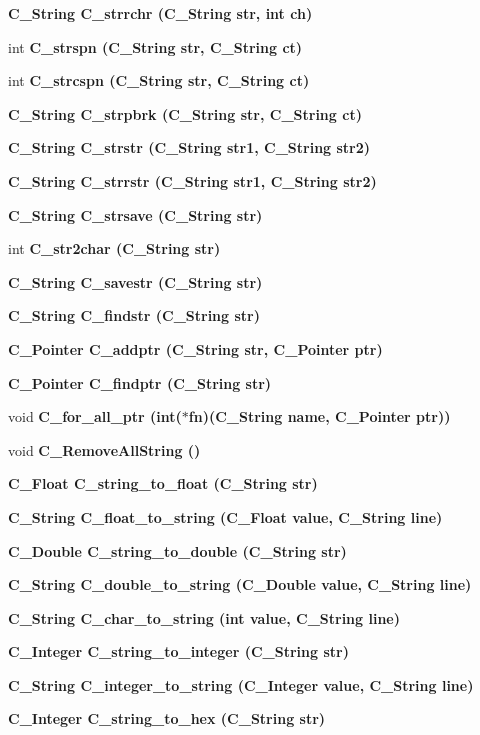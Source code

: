 \begin{CompactItemize}
\bf{C\_\-String} \bf{C\_\-strrchr} (\bf{C\_\-String} str, int ch)
\item 
int \bf{C\_\-strspn} (\bf{C\_\-String} str, \bf{C\_\-String} ct)
\item 
int \bf{C\_\-strcspn} (\bf{C\_\-String} str, \bf{C\_\-String} ct)
\item 
\bf{C\_\-String} \bf{C\_\-strpbrk} (\bf{C\_\-String} str, \bf{C\_\-String} ct)
\item 
\bf{C\_\-String} \bf{C\_\-strstr} (\bf{C\_\-String} str1, \bf{C\_\-String} str2)
\item 
\bf{C\_\-String} \bf{C\_\-strrstr} (\bf{C\_\-String} str1, \bf{C\_\-String} str2)
\item 
\bf{C\_\-String} \bf{C\_\-strsave} (\bf{C\_\-String} str)
\item 
int \bf{C\_\-str2char} (\bf{C\_\-String} str)
\item 
\bf{C\_\-String} \bf{C\_\-savestr} (\bf{C\_\-String} str)
\item 
\bf{C\_\-String} \bf{C\_\-findstr} (\bf{C\_\-String} str)
\item 
\bf{C\_\-Pointer} \bf{C\_\-addptr} (\bf{C\_\-String} str, \bf{C\_\-Pointer} ptr)
\item 
\bf{C\_\-Pointer} \bf{C\_\-findptr} (\bf{C\_\-String} str)
\item 
void \bf{C\_\-for\_\-all\_\-ptr} (int($\ast$fn)(\bf{C\_\-String} \bf{name}, \bf{C\_\-Pointer} ptr))
\item 
void \bf{C\_\-Remove\-All\-String} ()
\item 
\bf{C\_\-Float} \bf{C\_\-string\_\-to\_\-float} (\bf{C\_\-String} str)
\item 
\bf{C\_\-String} \bf{C\_\-float\_\-to\_\-string} (\bf{C\_\-Float} value, \bf{C\_\-String} line)
\item 
\bf{C\_\-Double} \bf{C\_\-string\_\-to\_\-double} (\bf{C\_\-String} str)
\item 
\bf{C\_\-String} \bf{C\_\-double\_\-to\_\-string} (\bf{C\_\-Double} value, \bf{C\_\-String} line)
\item 
\bf{C\_\-String} \bf{C\_\-char\_\-to\_\-string} (int value, \bf{C\_\-String} line)
\item 
\bf{C\_\-Integer} \bf{C\_\-string\_\-to\_\-integer} (\bf{C\_\-String} str)
\item 
\bf{C\_\-String} \bf{C\_\-integer\_\-to\_\-string} (\bf{C\_\-Integer} value, \bf{C\_\-String} line)
\item 
\bf{C\_\-Integer} \bf{C\_\-string\_\-to\_\-hex} (\bf{C\_\-String} str)
\item 

\end{CompactItemize}
